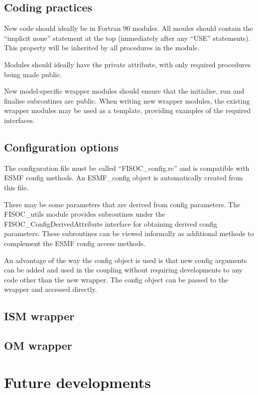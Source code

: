 \documentclass[12pt]{article}
\begin{document}
\subsection{Coding practices}

New code should ideally be in Fortran 90 modules.  
All moules should contain the ``implicit none'' statement at the top (immediately after any 
``USE'' statements).  This property will be inherited by all procedures in the module.

Modules should ideally have the private attribute, with only required procedures being 
made public. 

New model-specific wrapper modules should ensure that the initialise, run and finalise 
subroutines are public. 
When writing new wrapper modules, the existing wrapper modules may be used as a template, 
providing examples of the required interfaces.


\subsection{Configuration options}

The configuration file must be called ``FISOC\_config.rc'' and is compatible with ESMF 
config methods.  
An ESMF\_config object is automatically created from this file.

There may be some parameters that are derived from config parameters.  
The FISOC\_utils module provides subroutines under the 
FISOC\_ConfigDerivedAttribute interface 
for obtaining derived config parameters.
These subroutines can be viewed informally as additional methods to complement the ESMF config access methods. 

An advantage of the way the config object is used is that new config arguments can be added and 
used in the coupling without requiring developments to any code other than the new wrapper. 
The config object can be passed to the wrapper and accessed directly. 


\subsection{ISM wrapper}

\subsection{OM wrapper}

\section{Future developments}
\end{document}
